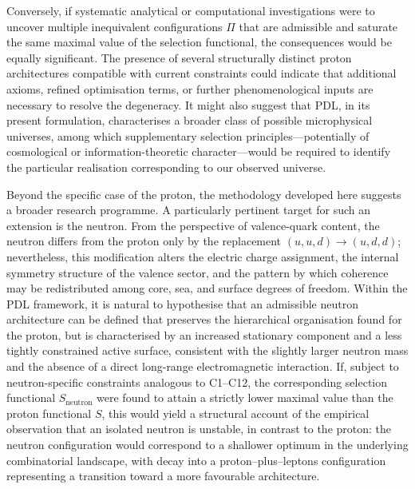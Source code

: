 \documentclass[11pt,a4paper]{article}
\begin{document}
Conversely, if systematic analytical or computational investigations were to uncover multiple inequivalent configurations $\Pi$ that are admissible and saturate the same maximal value of the selection functional, the consequences would be equally significant. The presence of several structurally distinct proton architectures compatible with current constraints could indicate that additional axioms, refined optimisation terms, or further phenomenological inputs are necessary to resolve the degeneracy. It might also suggest that PDL, in its present formulation, characterises a broader class of possible microphysical universes, among which supplementary selection principles—potentially of cosmological or information-theoretic character—would be required to identify the particular realisation corresponding to our observed universe.\cite{LaubscherIMRadPDL2026,RovelliRelationalQM1996}

Beyond the specific case of the proton, the methodology developed here suggests a broader research programme. A particularly pertinent target for such an extension is the neutron. From the perspective of valence-quark content, the neutron differs from the proton only by the replacement $(u,u,d)\to(u,d,d)$; nevertheless, this modification alters the electric charge assignment, the internal symmetry structure of the valence sector, and the pattern by which coherence may be redistributed among core, sea, and surface degrees of freedom.\cite{LaubscherPDLFull2026,LaubscherLDP2026} Within the PDL framework, it is natural to hypothesise that an admissible neutron architecture can be defined that preserves the hierarchical organisation found for the proton, but is characterised by an increased stationary component and a less tightly constrained active surface, consistent with the slightly larger neutron mass and the absence of a direct long-range electromagnetic interaction. If, subject to neutron-specific constraints analogous to C1–C12, the corresponding selection functional $S_{\mathrm{neutron}}$ were found to attain a strictly lower maximal value than the proton functional $S$, this would yield a structural account of the empirical observation that an isolated neutron is unstable, in contrast to the proton: the neutron configuration would correspond to a shallower optimum in the underlying combinatorial landscape, with decay into a proton–plus–leptons configuration representing a transition toward a more favourable architecture.
\end{document}
